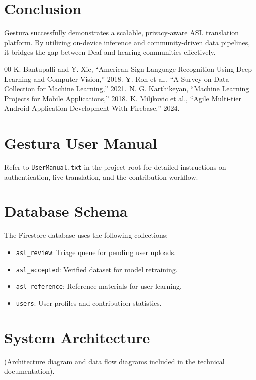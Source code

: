\documentclass[conference]{IEEEtran}
\begin{document}
\section{Conclusion}
Gestura successfully demonstrates a scalable, privacy-aware ASL translation platform. By utilizing on-device inference and community-driven data pipelines, it bridges the gap between Deaf and hearing communities effectively.

\begin{thebibliography}{00}
 K. Bantupalli and Y. Xie, ``American Sign Language Recognition Using Deep Learning and Computer Vision,'' 2018.
 Y. Roh et al., ``A Survey on Data Collection for Machine Learning,'' 2021.
 N. G. Karthikeyan, ``Machine Learning Projects for Mobile Applications,'' 2018.
 K. Miljkovic et al., ``Agile Multi-tier Android Application Development With Firebase,'' 2024.
\end{thebibliography}

\appendices
\section{Gestura User Manual}
Refer to \texttt{UserManual.txt} in the project root for detailed instructions on authentication, live translation, and the contribution workflow.

\section{Database Schema}
The Firestore database uses the following collections:
\begin{itemize}
    \item \texttt{asl\_review}: Triage queue for pending user uploads.
    \item \texttt{asl\_accepted}: Verified dataset for model retraining.
    \item \texttt{asl\_reference}: Reference materials for user learning.
    \item \texttt{users}: User profiles and contribution statistics.
\end{itemize}

\section{System Architecture}
(Architecture diagram and data flow diagrams included in the technical documentation).
\end{document}
